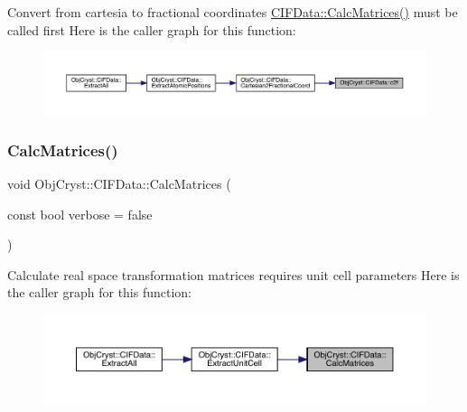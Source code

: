 Convert from cartesia to fractional coordinates \mbox{\hyperlink{class_obj_cryst_1_1_c_i_f_data_a51e099b2881e73eb776855177aed4ca9}{C\+I\+F\+Data\+::\+Calc\+Matrices()}} must be called first Here is the caller graph for this function\+:
\nopagebreak
\begin{figure}[H]
\begin{center}
\leavevmode
\includegraphics[width=350pt]{class_obj_cryst_1_1_c_i_f_data_a8b83f52c41137c83fdfd6c75d9d83888_icgraph}
\end{center}
\end{figure}
\mbox{\label{class_obj_cryst_1_1_c_i_f_data_a51e099b2881e73eb776855177aed4ca9}} 
\subsubsection{\texorpdfstring{CalcMatrices()}{CalcMatrices()}}
{\footnotesize\ttfamily void Obj\+Cryst\+::\+C\+I\+F\+Data\+::\+Calc\+Matrices (\begin{DoxyParamCaption}\item[{const bool}]{verbose = {\ttfamily false} }\end{DoxyParamCaption})}

Calculate real space transformation matrices requires unit cell parameters Here is the caller graph for this function\+:
\nopagebreak
\begin{figure}[H]
\begin{center}
\leavevmode
\includegraphics[width=350pt]{class_obj_cryst_1_1_c_i_f_data_a51e099b2881e73eb776855177aed4ca9_icgraph}
\end{center}
\end{figure}
\mbox{\label{class_obj_cryst_1_1_c_i_f_data_abe437ee4b2bbda8bf7a2861f9207a8ee}} 
